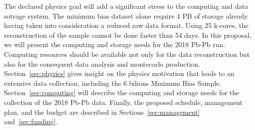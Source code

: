 The declared physics goal will add a significant stress to the computing and data sotrage system. The minimum bias dataset alone require 4 PB of storage already having taken into consideration a reduced raw data format. Using 25 k-cores, the reconstruction of the sample cannot be done faster than 54 days. In this proposal, we will present the computing and storage needs for the 2018 Pb-Pb run. Computing resources should be available not only for the data reconstruction but also for the consequent data analysis and montecarlo production. Section~\ref{sec:physics} gives insight on the physics motivation that leads to an extensive data collection, including the 6 bilions Minimum Bias Sample. Section~\ref{sec:computing} will describe the computing and storage needs for the collection of the 2018 Pb-Pb data. Finally, the proposed schedule, management plan, and the budget are described in Sections~\ref{sec:management} and~\ref{sec:funding}.

